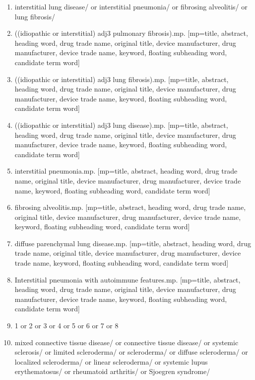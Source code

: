 \documentclass[
]{article}
\begin{document}
\begin{enumerate}
\def\labelenumi{\arabic{enumi}.}
\item
  interstitial lung disease/ or interstitial pneumonia/ or fibrosing alveolitis/ or lung fibrosis/
\item
  ((idiopathic or interstitial) adj3 pulmonary fibrosis).mp. {[}mp=title, abstract, heading word, drug trade name, original title, device manufacturer, drug manufacturer, device trade name, keyword, floating subheading word, candidate term word{]}
\item
  ((idiopathic or interstitial) adj3 lung fibrosis).mp. {[}mp=title, abstract, heading word, drug trade name, original title, device manufacturer, drug manufacturer, device trade name, keyword, floating subheading word, candidate term word{]}
\item
  ((idiopathic or interstitial) adj3 lung disease).mp. {[}mp=title, abstract, heading word, drug trade name, original title, device manufacturer, drug manufacturer, device trade name, keyword, floating subheading word, candidate term word{]}
\item
  interstitial pneumonia.mp. {[}mp=title, abstract, heading word, drug trade name, original title, device manufacturer, drug manufacturer, device trade name, keyword, floating subheading word, candidate term word{]}
\item
  fibrosing alveolitis.mp. {[}mp=title, abstract, heading word, drug trade name, original title, device manufacturer, drug manufacturer, device trade name, keyword, floating subheading word, candidate term word{]}
\item
  diffuse parenchymal lung disease.mp. {[}mp=title, abstract, heading word, drug trade name, original title, device manufacturer, drug manufacturer, device trade name, keyword, floating subheading word, candidate term word{]}
\item
  Interstitial pneumonia with autoimmune features.mp. {[}mp=title, abstract, heading word, drug trade name, original title, device manufacturer, drug manufacturer, device trade name, keyword, floating subheading word, candidate term word{]}
\item
  1 or 2 or 3 or 4 or 5 or 6 or 7 or 8
\item
  mixed connective tissue disease/ or connective tissue disease/ or systemic sclerosis/ or limited scleroderma/ or scleroderma/ or diffuse scleroderma/ or localized scleroderma/ or linear scleroderma/ or systemic lupus erythematosus/ or rheumatoid arthritis/ or Sjoegren syndrome/

\end{enumerate}
\end{document}
